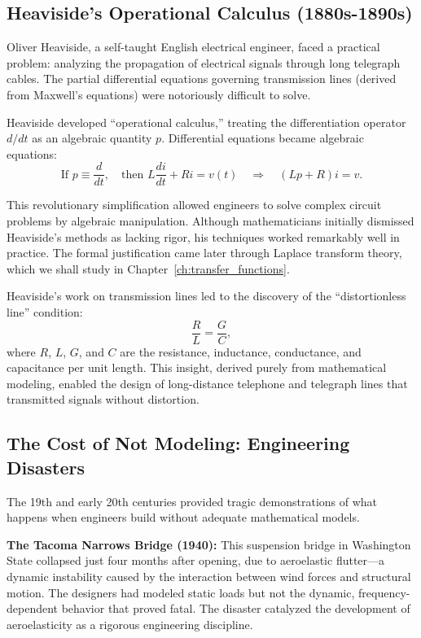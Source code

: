 \subsection{Heaviside's Operational Calculus (1880s-1890s)}

Oliver Heaviside, a self-taught English electrical engineer, faced a practical problem: analyzing the propagation of electrical signals through long telegraph cables. The partial differential equations governing transmission lines (derived from Maxwell's equations) were notoriously difficult to solve.

Heaviside developed ``operational calculus,'' treating the differentiation operator $d/dt$ as an algebraic quantity $p$. Differential equations became algebraic equations:
\begin{equation}
\text{If } p \equiv \frac{d}{dt}, \quad \text{then } L\frac{di}{dt} + Ri = v(t) \quad \Rightarrow \quad (Lp + R)i = v.
\end{equation}

This revolutionary simplification allowed engineers to solve complex circuit problems by algebraic manipulation. Although mathematicians initially dismissed Heaviside's methods as lacking rigor, his techniques worked remarkably well in practice. The formal justification came later through Laplace transform theory, which we shall study in Chapter~\ref{ch:transfer_functions}.

Heaviside's work on transmission lines led to the discovery of the ``distortionless line'' condition:
\begin{equation}
\frac{R}{L} = \frac{G}{C},
\end{equation}
where $R$, $L$, $G$, and $C$ are the resistance, inductance, conductance, and capacitance per unit length. This insight, derived purely from mathematical modeling, enabled the design of long-distance telephone and telegraph lines that transmitted signals without distortion.

\subsection{The Cost of Not Modeling: Engineering Disasters}

The 19th and early 20th centuries provided tragic demonstrations of what happens when engineers build without adequate mathematical models.

\textbf{The Tacoma Narrows Bridge (1940):} This suspension bridge in Washington State collapsed just four months after opening, due to aeroelastic flutter---a dynamic instability caused by the interaction between wind forces and structural motion. The designers had modeled static loads but not the dynamic, frequency-dependent behavior that proved fatal. The disaster catalyzed the development of aeroelasticity as a rigorous engineering discipline.

